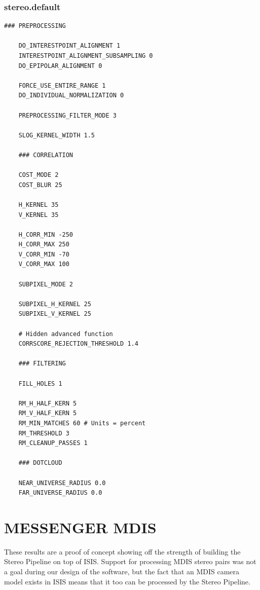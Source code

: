\subsubsection*{stereo.default}

\begin{center}\begin{minipage}{5.5in}
\begin{Verbatim}[frame=single,fontsize=\small,label=stereo.default for Apollo 15 Metric Camera]
    ### PREPROCESSING

    DO_INTERESTPOINT_ALIGNMENT 1
    INTERESTPOINT_ALIGNMENT_SUBSAMPLING 0
    DO_EPIPOLAR_ALIGNMENT 0

    FORCE_USE_ENTIRE_RANGE 1
    DO_INDIVIDUAL_NORMALIZATION 0

    PREPROCESSING_FILTER_MODE 3

    SLOG_KERNEL_WIDTH 1.5

    ### CORRELATION

    COST_MODE 2
    COST_BLUR 25

    H_KERNEL 35
    V_KERNEL 35

    H_CORR_MIN -250
    H_CORR_MAX 250
    V_CORR_MIN -70
    V_CORR_MAX 100

    SUBPIXEL_MODE 2

    SUBPIXEL_H_KERNEL 25
    SUBPIXEL_V_KERNEL 25

    # Hidden advanced function
    CORRSCORE_REJECTION_THRESHOLD 1.4

    ### FILTERING

    FILL_HOLES 1

    RM_H_HALF_KERN 5
    RM_V_HALF_KERN 5
    RM_MIN_MATCHES 60 # Units = percent
    RM_THRESHOLD 3
    RM_CLEANUP_PASSES 1

    ### DOTCLOUD

    NEAR_UNIVERSE_RADIUS 0.0
    FAR_UNIVERSE_RADIUS 0.0
\end{Verbatim}
\end{minipage}\end{center}

\section{MESSENGER MDIS}

These results are a proof of concept showing off the strength of
building the Stereo Pipeline on top of \ac{ISIS}. Support for processing
MDIS stereo pairs was not a goal during our design of the software,
but the fact that an MDIS camera model exists in ISIS means that
it too can be processed by the Stereo Pipeline.

